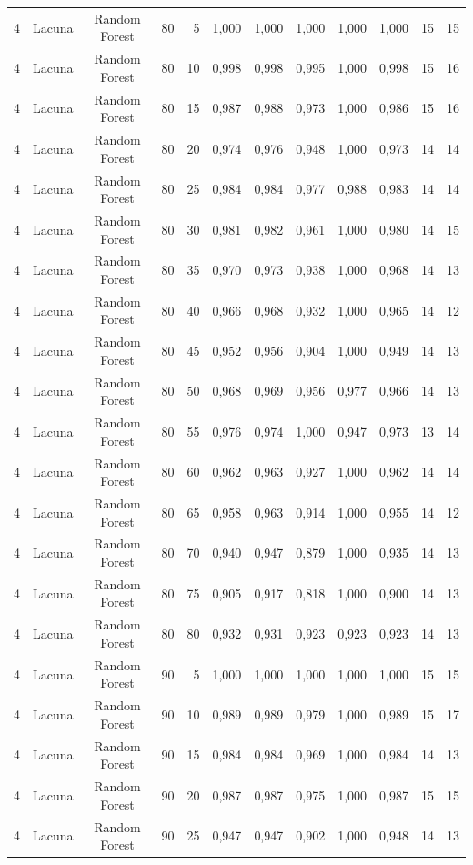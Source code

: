 \begin{longtable}{ccclrrrrrrrr}
4 & Lacuna & Random Forest & 80 & 5 & 1,000 & 1,000 & 1,000 & 1,000 & 1,000 & 15 & 15 \\
4 & Lacuna & Random Forest & 80 & 10 & 0,998 & 0,998 & 0,995 & 1,000 & 0,998 & 15 & 16 \\
4 & Lacuna & Random Forest & 80 & 15 & 0,987 & 0,988 & 0,973 & 1,000 & 0,986 & 15 & 16 \\
4 & Lacuna & Random Forest & 80 & 20 & 0,974 & 0,976 & 0,948 & 1,000 & 0,973 & 14 & 14 \\
4 & Lacuna & Random Forest & 80 & 25 & 0,984 & 0,984 & 0,977 & 0,988 & 0,983 & 14 & 14 \\
4 & Lacuna & Random Forest & 80 & 30 & 0,981 & 0,982 & 0,961 & 1,000 & 0,980 & 14 & 15 \\
4 & Lacuna & Random Forest & 80 & 35 & 0,970 & 0,973 & 0,938 & 1,000 & 0,968 & 14 & 13 \\
4 & Lacuna & Random Forest & 80 & 40 & 0,966 & 0,968 & 0,932 & 1,000 & 0,965 & 14 & 12 \\
4 & Lacuna & Random Forest & 80 & 45 & 0,952 & 0,956 & 0,904 & 1,000 & 0,949 & 14 & 13 \\
4 & Lacuna & Random Forest & 80 & 50 & 0,968 & 0,969 & 0,956 & 0,977 & 0,966 & 14 & 13 \\
4 & Lacuna & Random Forest & 80 & 55 & 0,976 & 0,974 & 1,000 & 0,947 & 0,973 & 13 & 14 \\
4 & Lacuna & Random Forest & 80 & 60 & 0,962 & 0,963 & 0,927 & 1,000 & 0,962 & 14 & 14 \\
4 & Lacuna & Random Forest & 80 & 65 & 0,958 & 0,963 & 0,914 & 1,000 & 0,955 & 14 & 12 \\
4 & Lacuna & Random Forest & 80 & 70 & 0,940 & 0,947 & 0,879 & 1,000 & 0,935 & 14 & 13 \\
4 & Lacuna & Random Forest & 80 & 75 & 0,905 & 0,917 & 0,818 & 1,000 & 0,900 & 14 & 13 \\
4 & Lacuna & Random Forest & 80 & 80 & 0,932 & 0,931 & 0,923 & 0,923 & 0,923 & 14 & 13 \\
4 & Lacuna & Random Forest & 90 & 5 & 1,000 & 1,000 & 1,000 & 1,000 & 1,000 & 15 & 15 \\
4 & Lacuna & Random Forest & 90 & 10 & 0,989 & 0,989 & 0,979 & 1,000 & 0,989 & 15 & 17 \\
4 & Lacuna & Random Forest & 90 & 15 & 0,984 & 0,984 & 0,969 & 1,000 & 0,984 & 14 & 13 \\
4 & Lacuna & Random Forest & 90 & 20 & 0,987 & 0,987 & 0,975 & 1,000 & 0,987 & 15 & 15 \\
4 & Lacuna & Random Forest & 90 & 25 & 0,947 & 0,947 & 0,902 & 1,000 & 0,948 & 14 & 13 \\

\end{longtable}
